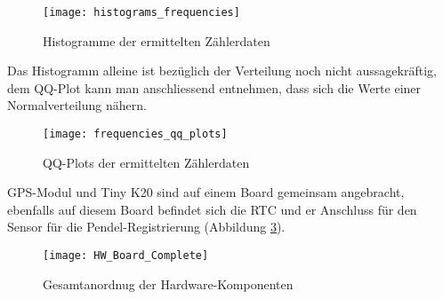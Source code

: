 	\begin{figure}[H]
		\centering
		\texttt{[image: histograms\_frequencies]}
		\caption{Histogramme der ermittelten Zählerdaten}
		\label{fig:freq_histograms}
	\end{figure}
	Das Histogramm alleine ist bezüglich der Verteilung noch nicht aussagekräftig, dem QQ-Plot kann man anschliessend entnehmen, dass sich die Werte einer Normalverteilung nähern.
	\begin{figure}[H]
		\centering
		\texttt{[image: frequencies\_qq\_plots]}
		\caption{QQ-Plots der ermittelten Zählerdaten}
		\label{fig:freq_qq_plot}
	\end{figure}
GPS-Modul und Tiny K20 sind auf einem Board gemeinsam angebracht, ebenfalls auf diesem Board befindet sich die RTC und er Anschluss für den Sensor für die Pendel-Registrierung (Abbildung \ref{fig:hardwareboard}).
	\begin{figure}[H]
		\centering
		\texttt{[image: HW\_Board\_Complete]}
		\caption{Gesamtanordnug der Hardware-Komponenten}
		\label{fig:hardwareboard}
	\end{figure}